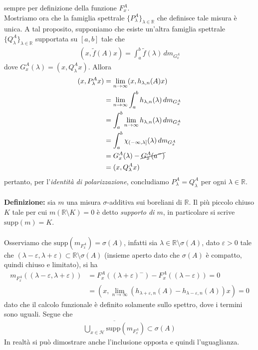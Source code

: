 \documentclass{article}
\numberwithin{equation}{subsection}
\begin{document}
sempre per definizione della funzione $F^A_x$. \\
Mostriamo ora che la famiglia spettrale $\{P^A_\lambda\}_{\lambda \in \mathbb{R}}$ che definisce tale misura è unica. A tal proposito, supponiamo che esiste un'altra famiglia spettrale $\{Q^A_\lambda\}_{\lambda \in \mathbb{R}}$ supportata su $[a, b]$ tale che 
\begin{align*}
    (x, \widetilde{f}(A)x) = \int_a^b \widetilde{f}(\lambda) \, dm_{G^A_x}
\end{align*}
dove $G^A_x(\lambda) = (x, Q^A_\lambda x)$. Allora 
\begin{align*}
    (x, P^A_\lambda x) &= \lim_{n \rightarrow \infty} (x, h_{\lambda, n}(A)x) \\
    &= \lim_{n \rightarrow \infty} \int_a^b h_{\lambda, n}(\lambda) \, dm_{G^A_x} \\
    &= \int_a^b \lim_{n \rightarrow \infty} h_{\lambda, n}(\lambda) \, dm_{G^A_x} \\
    &= \int_a^b \chi_{(-\infty, \lambda]}(\lambda) \, dm_{G^A_x} \\
    &= G^A_x(\lambda) - \cancel{G^A_x(a^-)} \\
    &= (x, Q^A_\lambda x)
\end{align*}
pertanto, per l'\textit{identità di polarizzazione}, concludiamo $P^A_\lambda = Q^A_\lambda$ per ogni $\lambda \in \mathbb{R}$. \\ \\
\textbf{Definizione:} sia $m$ una misura $\sigma$-additiva sui boreliani di $\mathbb{R}$. Il più piccolo chiuso $K$ tale per cui $m(\mathbb{R} \setminus K) = 0$ è detto \textit{supporto di $m$}, in particolare si scrive $\mathrm{supp}(m) = K$. \\ \\
Osserviamo che $\mathrm{supp}(m_{F^A_x}) = \sigma(A)$, infatti sia $\lambda \in \mathbb{R} \setminus \sigma(A)$, dato $\varepsilon > 0$ tale che $(\lambda - \varepsilon, \lambda + \varepsilon) \subset \mathbb{R} \setminus \sigma(A)$ (insieme aperto dato che $\sigma(A)$ è compatto, quindi chiuso e limitato), si ha
\begin{align*}
    m_{F^A_x}((\lambda - \varepsilon, \lambda + \varepsilon)) &= F^A_x((\lambda + \varepsilon)^-) - F^A_x((\lambda - \varepsilon)) = 0 \\
    &= (x, \lim_{n \rightarrow \infty}(h_{\lambda + \varepsilon, n}(A) - h_{\lambda - \varepsilon, n}(A))x) = 0
\end{align*}
dato che il calcolo funzionale è definito solamente sullo spettro, dove i termini sono uguali. Segue che 
\begin{align*}
    \overline{\bigcup_{x \in \mathcal{H}} \mathrm{supp}(m_{F^A_x})} \subset \sigma(A)
\end{align*}
In realtà si può dimostrare anche l'inclusione opposta e quindi l'uguaglianza.
\end{document}
